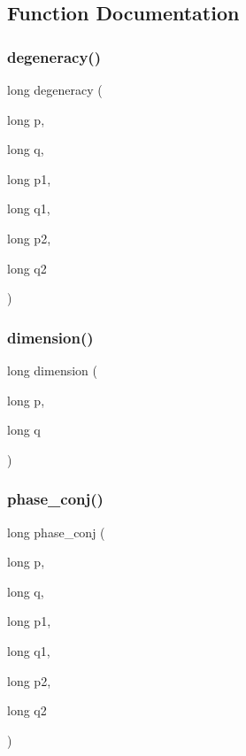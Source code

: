 \subsection{Function Documentation}
\mbox{\label{adat-devel_2lib_2SU3_2reps_8cc_a4ec52994cdf819e465b0743295228e5e}} 
\subsubsection{\texorpdfstring{degeneracy()}{degeneracy()}}
{\footnotesize\ttfamily long degeneracy (\begin{DoxyParamCaption}\item[{long}]{p,  }\item[{long}]{q,  }\item[{long}]{p1,  }\item[{long}]{q1,  }\item[{long}]{p2,  }\item[{long}]{q2 }\end{DoxyParamCaption})}

\mbox{\label{adat-devel_2lib_2SU3_2reps_8cc_a8251acad9553aca00780cebfaaba4d03}} 
\subsubsection{\texorpdfstring{dimension()}{dimension()}}
{\footnotesize\ttfamily long dimension (\begin{DoxyParamCaption}\item[{long}]{p,  }\item[{long}]{q }\end{DoxyParamCaption})}

\mbox{\label{adat-devel_2lib_2SU3_2reps_8cc_a0b98dde903eb63eb5e4ad4aefa492787}} 
\subsubsection{\texorpdfstring{phase\_conj()}{phase\_conj()}}
{\footnotesize\ttfamily long phase\+\_\+conj (\begin{DoxyParamCaption}\item[{long}]{p,  }\item[{long}]{q,  }\item[{long}]{p1,  }\item[{long}]{q1,  }\item[{long}]{p2,  }\item[{long}]{q2 }\end{DoxyParamCaption})}

